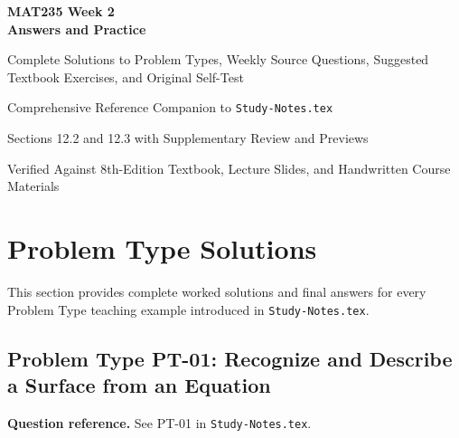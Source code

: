 \documentclass[11pt,letterpaper]{article}
\begin{document}
\hypersetup{pageanchor=false}

\begin{titlepage}
\centering
\vspace*{1.2in}
{\Huge\bfseries MAT235 Week 2\\[12pt] Answers and Practice\par}
\vspace{18pt}
{\LARGE Complete Solutions to Problem Types, Weekly Source Questions, Suggested Textbook Exercises, and Original Self-Test\par}
\vspace{22pt}
{\large Comprehensive Reference Companion to \texttt{Study-Notes.tex}\par}
\vfill
{\large Sections 12.2 and 12.3 with Supplementary Review and Previews\par}
\vspace{10pt}
{\small Verified Against 8th-Edition Textbook, Lecture Slides, and Handwritten Course Materials\par}
\end{titlepage}

\hypersetup{pageanchor=true}
\tableofcontents
\clearpage
{}

\section{Problem Type Solutions}\label{sec:pt-solutions}
This section provides complete worked solutions and final answers for every Problem Type teaching example introduced in \texttt{Study-Notes.tex}.

\subsection{Problem Type PT-01: Recognize and Describe a Surface from an Equation}
\textbf{Question reference.} See PT-01 in \texttt{Study-Notes.tex}.
\end{document}
